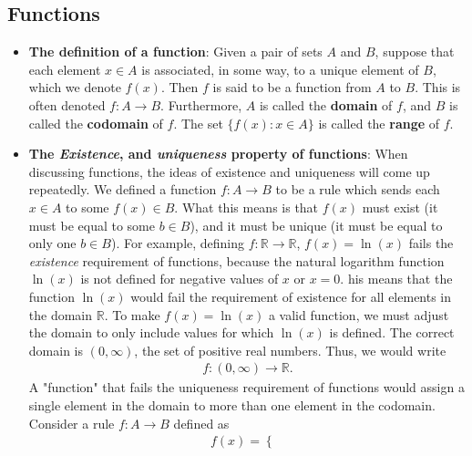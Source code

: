 \documentclass{report}
\begin{document}
    \subsection{Functions}
    \begin{itemize}
        \item \textbf{The definition of a function}: Given a pair of sets \( A \) and \( B \), suppose that each element \( x \in A \)
            is associated, in some way, to a unique element of \( B \), which we denote \( f(x) \). Then
            \( f \) is said to be a function from \( A \) to \( B \). This is often denoted
            \( f : A \to B \).
            \bigbreak \noindent 
            Furthermore, \( A \) is called the \textbf{domain} of \( f \), and \( B \) is called the \textbf{codomain} of \( f \).
            \bigbreak \noindent 
            The set \( \{f(x) : x \in A\} \) is called the \textbf{range} of \( f \).
        \item \textbf{The \textit{Existence}, and \textit{uniqueness} property of functions}: When discussing functions, the ideas of existence and uniqueness will come up repeatedly. We defined a function \( f : A \to B \) to be a rule which sends each \( x \in A \) to some \( f(x) \in B \). What this means is that \( f(x) \) must exist (it must be equal to some \( b \in B \)), and it must be unique (it must be equal to only one \( b \in B \)).
            \bigbreak \noindent 
            For example, defining $f: \mathbb{R} \to \mathbb{R}$, $f(x) = \ln{(x)}$ fails the \textit{existence} requirement of functions, because the natural logarithm function $\ln{(x)}$ is not defined for negative values of $x$ or $x=0 $. his means that the function $\ln(x)$ would fail the requirement of existence for all elements in the domain $\mathbb{R}$.
            \bigbreak \noindent 
            To make $f(x) = \ln(x) $ a valid function, we must adjust the domain to only include values for which $\ln(x)$ is defined. The correct domain is $(0,\infty)$, the set of positive real numbers. Thus, we would write
            \begin{align*}
                f: (0, \infty) \to \mathbb{R}
            .\end{align*}
            A "function" that fails the uniqueness requirement of functions would assign a single element in the domain to more than one element in the codomain.
            \bigbreak \noindent 
            Consider a rule $f: A \to B $ defined as 
            \begin{align*}
                f(x) = \begin{cases}

\end{cases}
\end{align*}
\end{itemize}
\end{document}
